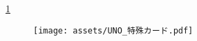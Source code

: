 \documentclass[11pt]{ltjsarticle}
\begin{document}
\ref{fig:ワイルド・ドローフォーカードの例}

\begin{figure}[h]
  \begin{center}
    \texttt{[image: assets/UNO\_特殊カード.pdf]}
    \label{fig:ワイルド・ドローフォーカードの例}
  \end{center}
\end{figure}
\end{document}
